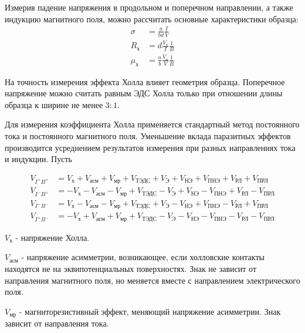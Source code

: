 Измерив падение напряжения в продольном и поперечном направлении, а также индукцию магнитного поля, можно рассчитать основные характеристики образца:
\begin{equation}
\begin{split}
\sigma &= \frac{a}{b d} \frac{I}{V} \\
R_{\text{х}} &= d \frac{V_{\text{х}}}{I} \frac{1}{B} \\
\mu_{\text{х}} &= \frac{a}{b} \frac{V_{\text{х}}}{V} \frac{1}{B}
\end{split}
\label{eq3_mu}
\end{equation}

На точность измерения эффекта Холла влияет геометрия образца. Поперечное напряжение можно считать равным ЭДС Холла только при отношении длины образца к ширине не менее $3:1$.

Для измерения коэффициента Холла применяется стандартный метод постоянного тока и постоянного магнитного поля. Уменьшение вклада паразитных эффектов производится усреднением результатов измерения при разных направлениях тока и индукции. Пусть

\begin{equation}
\begin{split}
V_{I^{+}B^{+}} &= V_{\text{х}} + V_{\text{асм}} + V_{\text{мр}} + V_{\text{ТЭДС}} + V_{\text{Э}} + V_{\text{НЭ}} + V_{\text{ПНЭ}} + V_{\text{РЛ}} + V_{\text{ПРЛ}} \\
V_{I^{-}B^{+}} &= -V_{\text{х}} - V_{\text{асм}} - V_{\text{мр}} + V_{\text{ТЭДС}} - V_{\text{Э}} + V_{\text{НЭ}} - V_{\text{ПНЭ}} + V_{\text{РЛ}} - V_{\text{ПРЛ}} \\
V_{I^{-}B^{-}} &= V_{\text{х}} - V_{\text{асм}} - V_{\text{мр}} + V_{\text{ТЭДС}} + V_{\text{Э}} - V_{\text{НЭ}} + V_{\text{ПНЭ}} - V_{\text{РЛ}} + V_{\text{ПРЛ}} \\
V_{I^{+}B^{-}} &= -V_{\text{х}} + V_{\text{асм}} + V_{\text{мр}} + V_{\text{ТЭДС}} - V_{\text{Э}} - V_{\text{НЭ}} - V_{\text{ПНЭ}} - V_{\text{РЛ}} - V_{\text{ПРЛ}}
\end{split}
\end{equation}

$V_{\text{х}}$ - напряжение Холла.

$V_{\text{асм}}$ - напряжение асимметрии, возникающее, если холловские контакты находятся не на эквипотенциальных поверхностях. Знак не зависит от направления магнитного поля, но меняется вместе с направлением электрического поля.

$V_{\text{мр}}$ - магниторезистивный эффект, меняющий напряжение асимметрии. Знак зависит от направления тока.

